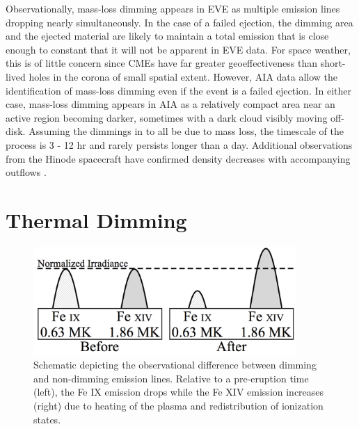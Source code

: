 Observationally, mass-loss dimming appears in EVE as multiple emission lines dropping nearly simultaneously. In the case of a failed ejection, the dimming area and the ejected material are likely to maintain a total emission that is close enough to constant that it will not be apparent in EVE data. For space weather, this is of little concern since CMEs have far greater geoeffectiveness than short-lived holes in the corona of small spatial extent. However, AIA data allow the identification of mass-loss dimming even if the event is a failed ejection. In either case, mass-loss dimming appears in AIA as a relatively compact area near an active region becoming darker, sometimes with a dark cloud visibly moving off-disk. Assuming the dimmings in \citet{Reinard2008} to all be due to mass loss, the timescale of the process is 3 - 12 hr and rarely persists longer than a day. Additional observations from the Hinode spacecraft have confirmed density decreases with accompanying outflows \citep{Attrill2010, Harra2010, Tian2012}.

\section{Thermal Dimming}
\label{sec:thermalDimming}

\begin{figure}[!h]
	\caption[Schematic of thermal dimming]{
	    Schematic depicting the observational difference between dimming and non-dimming emission
	    lines. Relative to a pre-eruption time (left), the Fe IX emission drops while the Fe XIV
	    emission increases (right) due to heating of the plasma and redistribution of ionization
	    states.
	}
    \begin{center}
	    \includegraphics[width=100mm]{Images/ThermalDimming.png}
    \end{center}
    \label{thermalDimming}
\end{figure}

